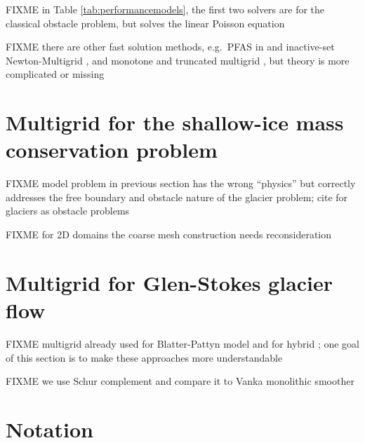 \documentclass[letterpaper,final,12pt,reqno]{amsart}
\theoremstyle{claim}
\numberwithin{equation}{section}
\numberwithin{figure}{section}
\numberwithin{table}{section}
\numberwithin{theorem}{section}
\begin{document}
FIXME in Table \ref{tab:performancemodels}, the first two solvers are for the classical obstacle problem, but  solves the linear Poisson equation

FIXME there are other fast solution methods, e.g.~PFAS in \cite{BrandtCryer1983} and inactive-set Newton-Multigrid \cite[Chapter 12]{Bueler2021}, and monotone and truncated multigrid \cite{GraeserKornhuber2009}, but theory is more complicated or missing

\section{Multigrid for the shallow-ice mass conservation problem} \label{sec:sia}

FIXME model problem in previous section has the wrong ``physics'' but correctly addresses the free boundary and obstacle nature of the glacier problem; cite for glaciers as obstacle problems \cite{Bueler2016,Bueler2020,Calvoetal2002,JouvetBueler2012,Jouvetetal2013}

FIXME for 2D domains the coarse mesh construction needs reconsideration


\section{Multigrid for Glen-Stokes glacier flow} \label{sec:stokes}

FIXME multigrid already used for Blatter-Pattyn model \cite{BrownSmithAhmadia2013} and for hybrid \cite{Jouvetetal2013}; one goal of this section is to make these approaches more understandable

FIXME we use Schur complement \cite{Bueler2021,Elmanetal2014} and compare it to Vanka monolithic smoother \cite{Farrelletal2019}

\small

\bigskip



\normalsize

\appendix
\section{Notation}
\end{document}
